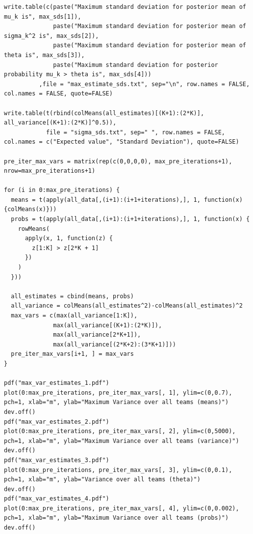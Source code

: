 \documentclass[11pt]{article} %
\begin{document}
\begin{lstlisting}
write.table(c(paste("Maximum standard deviation for posterior mean of mu_k is", max_sds[1]),
              paste("Maximum standard deviation for posterior mean of sigma_k^2 is", max_sds[2]),
              paste("Maximum standard deviation for posterior mean of theta is", max_sds[3]),
              paste("Maximum standard deviation for posterior probability mu_k > theta is", max_sds[4]))
          ,file = "max_estimate_sds.txt", sep="\n", row.names = FALSE, col.names = FALSE, quote=FALSE)

write.table(t(rbind(colMeans(all_estimates)[(K+1):(2*K)], all_variance[(K+1):(2*K)]^0.5)),
            file = "sigma_sds.txt", sep=" ", row.names = FALSE, col.names = c("Expected value", "Standard Deviation"), quote=FALSE)

pre_iter_max_vars = matrix(rep(c(0,0,0,0), max_pre_iterations+1), nrow=max_pre_iterations+1)

for (i in 0:max_pre_iterations) {
  means = t(apply(all_data[,(i+1):(i+1+iterations),], 1, function(x) {colMeans(x)}))
  probs = t(apply(all_data[,(i+1):(i+1+iterations),], 1, function(x) {
    rowMeans(
      apply(x, 1, function(z) {
        z[1:K] > z[2*K + 1]
      })
    )
  }))
  
  all_estimates = cbind(means, probs)
  all_variance = colMeans(all_estimates^2)-colMeans(all_estimates)^2
  max_vars = c(max(all_variance[1:K]),
              max(all_variance[(K+1):(2*K)]),
              max(all_variance[2*K+1]),
              max(all_variance[(2*K+2):(3*K+1)]))
  pre_iter_max_vars[i+1, ] = max_vars
}

pdf("max_var_estimates_1.pdf")
plot(0:max_pre_iterations, pre_iter_max_vars[, 1], ylim=c(0,0.7), pch=1, xlab="m", ylab="Maximum Variance over all teams (means)")
dev.off()
pdf("max_var_estimates_2.pdf")
plot(0:max_pre_iterations, pre_iter_max_vars[, 2], ylim=c(0,5000), pch=1, xlab="m", ylab="Maximum Variance over all teams (variance)")
dev.off()
pdf("max_var_estimates_3.pdf")
plot(0:max_pre_iterations, pre_iter_max_vars[, 3], ylim=c(0,0.1), pch=1, xlab="m", ylab="Variance over all teams (theta)")
dev.off()
pdf("max_var_estimates_4.pdf")
plot(0:max_pre_iterations, pre_iter_max_vars[, 4], ylim=c(0,0.002), pch=1, xlab="m", ylab="Maximum Variance over all teams (probs)")
dev.off()
\end{lstlisting}
\end{document}

